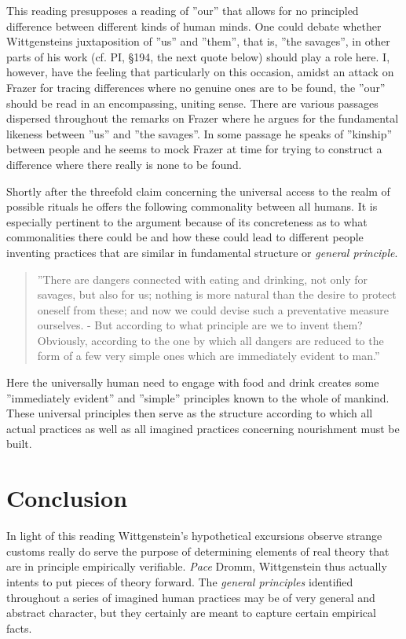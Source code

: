 \documentclass{article}
\begin{document}
This reading presupposes a reading of ''our'' that allows for no principled difference between different kinds of human minds. One could debate whether Wittgensteins juxtaposition of ''us'' and ''them'', that is, ''the savages'', in other parts of his work (cf. PI, §194, the next quote below) should play a role here. I, however, have the feeling that particularly on this occasion, amidst an attack on Frazer for tracing differences where no genuine ones are to be found, the ''our'' should be read in an encompassing, uniting sense. There are various passages dispersed throughout the remarks on Frazer where he argues for the fundamental likeness between ''us'' and ''the savages''. In some passage he speaks of ''kinship'' between people and he seems to mock Frazer at time for trying to construct a difference where there really is none to be found. 

Shortly after the threefold claim concerning the universal access to the realm of possible rituals he offers the following commonality between all humans. It is especially pertinent to the argument because of its concreteness as to what commonalities there could be and how these could lead to different people inventing practices that are similar in fundamental structure or \textit{general principle}.
\begin{quote}
''There are dangers connected with eating and drinking, not only for savages, but also for us; nothing is more natural than the desire to protect oneself from these; and now we could devise such a preventative measure ourselves. - But according to what principle are we to invent them? Obviously, according to the one by which all dangers are reduced to the form of a few very simple ones which are immediately evident to man.''
\end{quote} %
Here the universally human need to engage with food and drink creates some ''immediately evident'' and ''simple'' principles known to the whole of mankind. These universal principles then serve as the structure according to which all actual practices as well as all imagined practices concerning nourishment must be built.

\section{Conclusion}
In light of this reading Wittgenstein's hypothetical excursions observe strange customs really do serve the purpose of determining elements of real theory that are in principle empirically verifiable. \textit{Pace} Dromm, Wittgenstein thus actually intents to put pieces of theory forward. The \textit{general principles} identified throughout a series of imagined human practices may be of very general and abstract character, but they certainly are meant to capture certain empirical facts. 
\end{document}
